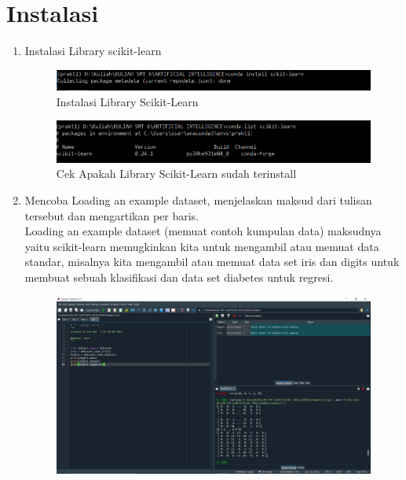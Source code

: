 \section{Instalasi}
\begin{enumerate}
    \item Instalasi Library scikit-learn
    \begin{figure}[H]
    \centering
    \includegraphics[width=1\textwidth]{figures/1184030/Screenshot (2143).png}
    \caption{Instalasi Library Scikit-Learn}
    \label{fig:my_label}
\end{figure}
\begin{figure}[H]
    \centering
    \includegraphics[width=1\textwidth]{figures/1184030/Screenshot (2144).png}
    \caption{Cek Apakah Library Scikit-Learn sudah terinstall}
    \label{fig:my_label}
\end{figure}
    \item Mencoba Loading an example dataset, menjelaskan maksud dari tulisan tersebut dan mengartikan per baris.\\
Loading an example dataset (memuat contoh kumpulan data) maksudnya yaitu scikit-learn memugkinkan kita untuk mengambil atau memuat data standar, misalnya kita mengambil atau memuat data set iris dan digits untuk membuat sebuah klasifikasi dan data set diabetes untuk regresi.\\
\begin{figure}[H]
    \centering
    \includegraphics[width=1\textwidth]{figures/1184030/Screenshot (2159).png}

\end{figure}
\end{enumerate}
